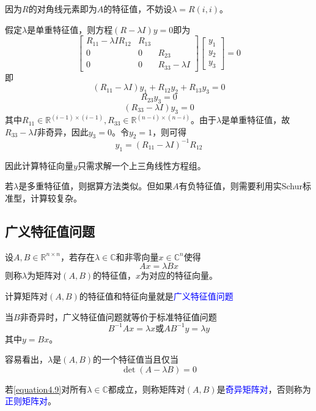 \documentclass[12pt,a4paper]{article}
\begin{document}
因为$R$的对角线元素即为$A$的特征值，不妨设$\lambda=R(i,i)$。

假定$\lambda$是单重特征值，则方程$(R-\lambda I)y=0$即为$$
\left[\begin{array}{ccc}{R_{11}-\lambda I R_{12}} & {R_{13}} \\ {0} & {0} & {R_{23}} \\ {0} & {0} & {R_{33}-\lambda I}\end{array}\right]\left[\begin{array}{l}{y_{1}} \\ {y_{2}} \\ {y_{3}}\end{array}\right]=0
$$即\begin{equation}
\left(R_{11}-\lambda I\right) y_{1}+R_{12} y_{2}+R_{13} y_{3}=0
\end{equation}\begin{equation}
R_{23} y_{3}=0
\end{equation}\begin{equation}
\left(R_{33}-\lambda I\right) y_{3}=0
\end{equation}其中$R_{11} \in \mathbb{R}^{(i-1) \times(i-1)}, R_{33} \in \mathbb{R}^{(n-i) \times(n-i)}$。由于$\lambda$是单重特征值，故
$R_{33}-\lambda I$非奇异，因此$y_3=0$。令$y_2=1$，则可得$$
y_{1}=\left(R_{11}-\lambda I\right)^{-1} R_{12}
$$

因此计算特征向量$y$只需求解一个上三角线性方程组。

若$\lambda$是多重特征值，则据算方法类似。但如果$A$有负特征值，则需要利用实Schur标准型，计算较复杂。
\subsection{广义特征值问题}
设$A, B \in \mathbb{R}^{n \times n}$，若存在$\lambda \in \mathbb{C}$和非零向量$x \in \mathbb{C}^{n}$使得$$
A x=\lambda B x
$$则称$\lambda$为矩阵对$(A,B)$的特征值，$x$为对应的特征向量。

计算矩阵对$(A,B)$的特征值和特征向量就是\textcolor{blue}{广义特征值问题}

当$B$非奇异时，广义特征值问题就等价于标准特征值问题$$
B^{-1} A x=\lambda x
 \text{或}A B^{-1} y=\lambda y
$$其中$y=Bx$。

容易看出，$\lambda$是$(A,B)$的一个特征值当且仅当\begin{equation}
\operatorname{det}(A-\lambda B)=0
\label{equation4.9}
\end{equation}

若\ref{equation4.9}对所有$\lambda \in \mathbb{C}$都成立，则称矩阵对$(A,B)$是\textcolor{blue}{奇异矩阵对}，否则称为\textcolor{blue}{正则矩阵对}。
\end{document}
